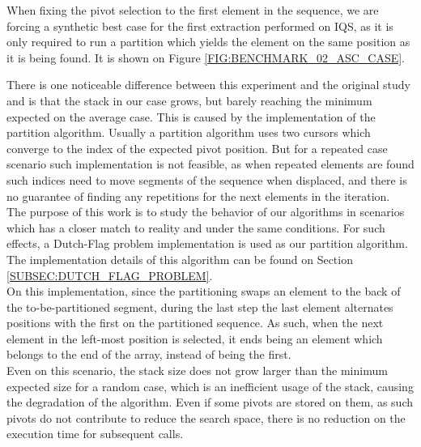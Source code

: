 When fixing the pivot selection to the first element in the sequence, we are forcing a synthetic best case for the first extraction performed on IQS, as it is only required to run a partition which yields the element on the same position as it is being found. It is shown on Figure \ref{FIG:BENCHMARK_02_ASC_CASE}. 

There is one noticeable difference between this experiment and the original study and is that the stack in our case grows, but barely reaching the minimum expected on the average case. This is caused by the implementation of the partition algorithm. Usually a partition algorithm uses two cursors which converge to the index of the expected pivot position. But for a repeated case scenario such implementation is not feasible, as when repeated elements are found such indices need to move segments of the sequence when displaced, and there is no guarantee of finding any repetitions for the next elements in the iteration.\\

The purpose of this work is to study the behavior of our algorithms in scenarios which has a closer match to reality and under the same conditions. For such effects, a Dutch-Flag problem implementation is used as our partition algorithm. The implementation details of this algorithm can be found on Section \ref{SUBSEC:DUTCH_FLAG_PROBLEM}.\\

On this implementation, since the partitioning swaps an element to the back of the to-be-partitioned segment, during the last step the last element alternates positions with the first on the partitioned sequence. As such, when the next element in the left-most position is selected, it ends being an element which belongs to the end of the array, instead of being the first.\\

Even on this scenario, the stack size does not grow larger than the minimum expected size for a random case, which is an inefficient usage of the stack, causing the degradation of the algorithm. Even if some pivots are stored on them, as such pivots do not contribute to reduce the search space, there is no reduction on the execution time for subsequent calls.\\

